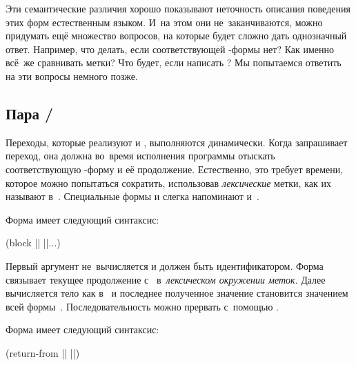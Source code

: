 Эти семантические различия хорошо показывают неточность описания поведения этих
форм естественным языком. И~на этом они не~заканчиваются, можно придумать ещё
множество вопросов, на которые будет сложно дать однозначный ответ. Например,
что делать, если соответствующей -формы нет? Как именно всё~же
сравнивать метки? Что будет, если написать ? Мы попытаемся ответить на эти вопросы немного позже.


\subsection{\texorpdfstring%
{Пара \protect{}/\protect{}}%
{Пара block/return-from}}%
\label{escape/forms/ssect:block-return}

Переходы, которые реализуют  и , выполняются динамически.
Когда  запрашивает переход, она должна во~время исполнения программы
отыскать соответствующую -форму и её продолжение. Естественно, это
требует времени, которое можно попытаться сократить, использовав
\emph{лексические} метки, как их называют в~{\CommonLisp}. Специальные формы
 и  слегка напоминают  и~.

Форма  имеет следующий синтаксис:

\begin{code:lisp}
(block || ||...)
\end{code:lisp}

\noindent
Первый аргумент не~вычисляется и должен быть идентификатором. Форма 
связывает текущее продолжение с~ в~\emph{лексическом окружении
меток}. Далее вычисляется тело  как в~ и последнее
полученное значение становится значением всей формы~.
Последовательность можно прервать с~помощью .


Форма  имеет следующий синтаксис:

\begin{code:lisp}
(return-from || ||)
\end{code:lisp}

